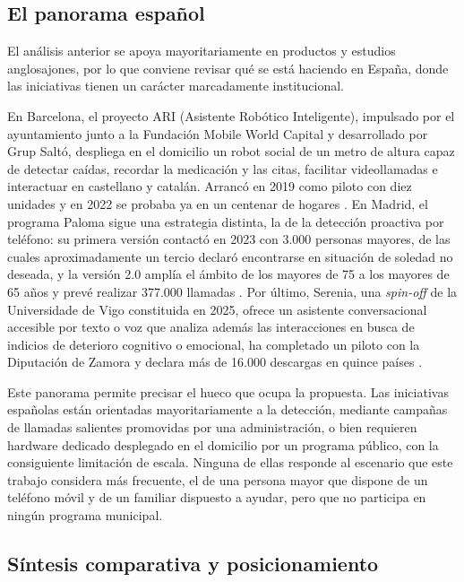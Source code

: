 \subsection{El panorama español}

El análisis anterior se apoya mayoritariamente en productos y estudios anglosajones, por lo que conviene
revisar qué se está haciendo en España, donde las iniciativas tienen un carácter marcadamente institucional.

En Barcelona, el proyecto ARI (Asistente Robótico Inteligente), impulsado por el ayuntamiento junto a
la Fundación Mobile World Capital y desarrollado por Grup Saltó, despliega en el domicilio un robot social de
un metro de altura capaz de detectar caídas, recordar la medicación y las citas, facilitar videollamadas e
interactuar en castellano y catalán. Arrancó en 2019 como piloto con diez unidades y en 2022 se probaba ya en
un centenar de hogares \citep{ARIBarcelona}. En Madrid, el programa Paloma sigue una estrategia
distinta, la de la detección proactiva por teléfono: su primera versión contactó en 2023 con 3.000 personas
mayores, de las cuales aproximadamente un tercio declaró encontrarse en situación de soledad no deseada, y la
versión 2.0 amplía el ámbito de los mayores de 75 a los mayores de 65 años y prevé realizar 377.000 llamadas
\citep{Paloma2026}. Por último, Serenia, una \textit{spin-off} de la Universidade de Vigo constituida
en 2025, ofrece un asistente conversacional accesible por texto o voz que analiza además las interacciones en
busca de indicios de deterioro cognitivo o emocional, ha completado un piloto con la Diputación de Zamora y
declara más de 16.000 descargas en quince países \citep{Serenia2025}.

Este panorama permite precisar el hueco que ocupa la propuesta. Las iniciativas españolas están orientadas
mayoritariamente a la detección, mediante campañas de llamadas salientes promovidas por una administración, o
bien requieren hardware dedicado desplegado en el domicilio por un programa público, con la consiguiente
limitación de escala. Ninguna de ellas responde al escenario que este trabajo considera más frecuente, el de
una persona mayor que dispone de un teléfono móvil y de un familiar dispuesto a ayudar, pero que no participa
en ningún programa municipal.

\subsection{Síntesis comparativa y posicionamiento}


